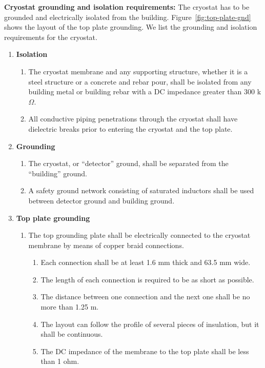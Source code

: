 \textbf{Cryostat grounding and isolation requirements:}
%
The cryostat has to be grounded and electrically isolated from the building. 
Figure~\ref{fig:top-plate-gnd} shows the layout of the top plate grounding.
We list the grounding and isolation requirements for the cryostat. 

\begin{enumerate}
\item \textbf{Isolation}
	\begin{enumerate}
	\item The cryostat membrane and any supporting structure, whether it is a steel structure or a concrete and rebar pour, shall be isolated from any building metal or building rebar with a DC impedance greater than 300 k$\Omega$.
	\item All conductive piping penetrations through the cryostat shall have dielectric breaks prior to entering the cryostat and the top plate.
	\end{enumerate}

\item \textbf{Grounding}
	\begin{enumerate}
	\item The cryostat, or ``detector'' ground, shall be separated from the ``building'' ground.
	\item A safety ground network consisting of saturated inductors shall be used between detector ground and building ground.
	\end{enumerate}

\item \textbf{Top plate grounding}
	\begin{enumerate}
	\item The top grounding plate shall be electrically connected to the cryostat membrane by means of copper braid connections.
	   \begin{enumerate}
	   \item Each connection shall be at least 1.6 mm thick and 63.5 mm wide.
	   \item The length of each connection is required to be as short as possible.
	   \item The distance between one connection and the next one shall be no more than 1.25 m.
	   \item The layout can follow the profile of several pieces of insulation, but it shall be continuous.	
	   \item The DC impedance of the membrane to the top plate shall be less than 1 ohm.
	   \end{enumerate}
	\end{enumerate}
\end{enumerate}


